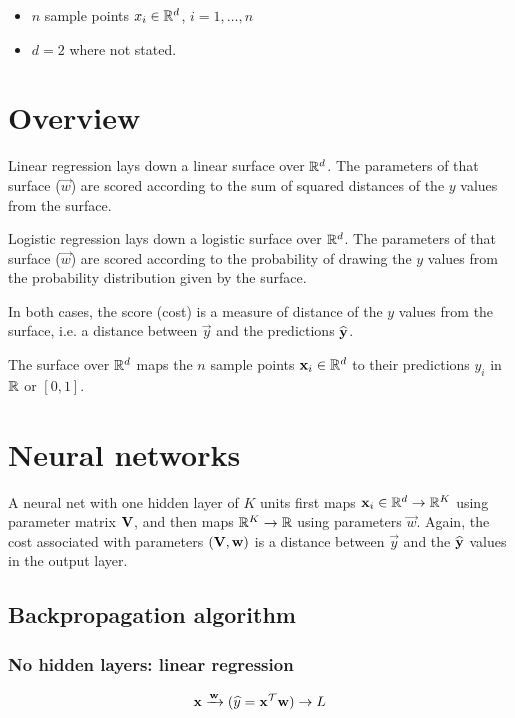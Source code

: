 \begin{itemize}
\item $n$ sample points $x_i \in \mathbb{R}^d$, $i = 1, \ldots, n$
\item $d = 2$ where not stated.
\end{itemize}

\section{Overview}

Linear regression lays down a linear surface over $\mathbb{R}^d$. The parameters of
that surface ($\vec w$) are scored according to the sum of squared distances of
the $y$ values from the surface.

Logistic regression lays down a logistic surface over $\mathbb{R}^d$. The parameters of
that surface ($\vec w$) are scored according to the probability of drawing the
$y$ values from the probability distribution given by the surface.

In both cases, the score (cost) is a measure of distance of the $y$ values from
the surface, i.e. a distance between $\vec y$ and the predictions
$\widehat {\mathbf y}$.

The surface over $\mathbb{R}^d$ maps the $n$ sample points $\mathbf x_i \in \mathbb{R}^d$ to their
predictions $y_i$ in $\mathbb{R}$ or $[0, 1]$.

\section{Neural networks}

A neural net with one hidden layer of $K$ units first maps
$\mathbf x_i \in \mathbb{R}^d \to \mathbb{R}^K$ using parameter matrix $\mathbf V$, and then maps
$\mathbb{R}^K \to \mathbb{R}$ using parameters $\vec w$. Again, the cost associated with
parameters $(\mathbf V, \mathbf w)$ is a distance between $\vec y$ and the
$\widehat {\mathbf y}$ values in the output layer.

\subsection{Backpropagation algorithm}

\subsubsection{No hidden layers: linear regression}

\begin{align*}
  \mathbf x \xrightarrow{\mathbf w} (\widehat y = \mathbf x^\mathcal T\mathbf w) \rightarrow L
\end{align*}


